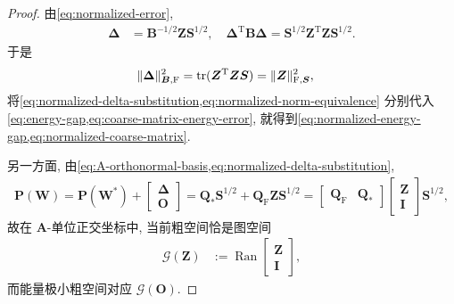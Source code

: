 \documentclass{ctexart}
\newcommand{\q}{\quad}
\newcommand{\T}{\mathrm{T}}
\DeclareMathOperator{\tr}{tr}
\DeclareMathOperator{\Ran}{Ran}
\DeclarePairedDelimiter\norm{\lVert}{\rVert}
\begin{document}
\begin{proof}
由\cref{eq:normalized-error},
\begin{align}
    \bm\Delta&=\bm B^{-1/2}\bm Z\bm S^{1/2},\q
    \bm\Delta^\T\bm B\bm\Delta
    =\bm S^{1/2}\bm Z^\T\bm Z\bm S^{1/2}.
    \label{eq:normalized-delta-substitution}
\end{align}
于是
\begin{align}
    \norm{\bm\Delta}_{\bm B,\mathrm F}^2
    &=\tr(\bm Z^\T\bm Z\bm S)
     =\norm{\bm Z}_{\mathrm F,\bm S}^2,
    \label{eq:normalized-norm-equivalence}
\end{align}
将\cref{eq:normalized-delta-substitution,eq:normalized-norm-equivalence} 分别代入\cref{eq:energy-gap,eq:coarse-matrix-energy-error}, 就得到\cref{eq:normalized-energy-gap,eq:normalized-coarse-matrix}.

另一方面, 由\cref{eq:A-orthonormal-basis,eq:normalized-delta-substitution},
\begin{align}
    \bm P(\bm W)=\bm P(\bm W^\ast)
      +\begin{bmatrix}\bm\Delta\\\mathbf O\end{bmatrix}=\bm Q_\ast\bm S^{1/2}
      +\bm Q_{\mathrm F}\bm Z\bm S^{1/2}=\begin{bmatrix}\bm Q_{\mathrm F}&\bm Q_\ast\end{bmatrix}
      \begin{bmatrix}\bm Z\\\bm I\end{bmatrix}\bm S^{1/2},
    \label{eq:interpolation-graph-factorization-proof}
\end{align}
故在 $\bm A$-单位正交坐标中, 当前粗空间恰是图空间
\begin{align}
    \mathcal G(\bm Z)&:=\Ran\begin{bmatrix}\bm Z\\\bm I\end{bmatrix},
    \label{eq:graph-space-definition}
\end{align}
而能量极小粗空间对应 $\mathcal G(\mathbf O)$.


\end{proof}
\end{document}
